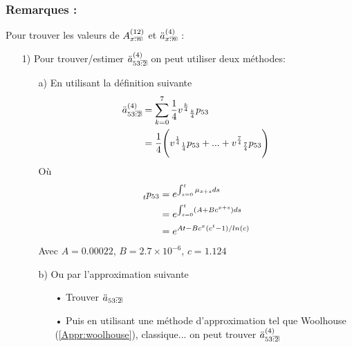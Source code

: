 \documentclass[11pt,french]{report}
\makeatletter
\DeclareRobustCommand{\annuity}[1]{%
\def\arraystretch{0}%
\setlength\arraycolsep{.7pt}%
\setlength\arrayrulewidth{.3pt}%
\begin{array}[b]{@{}c|}\hline
\\[\arraycolsep]%
\scriptstyle #1%
\end{array}%
}
\newcommand{\indiceGauche}[2]{{\vphantom{#2}}_{#1}#2}
\makeatother
\begin{document}
\subsubsection*{Remarques :}
Pour trouver les valeurs de $A_{x \annuity{:n}}^{(12)}$ et $\ddot{a}_{x \annuity{:n}}^{(4)}$ :
\begin{itemize}
\item[1)] Pour trouver/estimer $\ddot{a}_{53 \annuity{:2}}^{(4)}$ on peut utiliser deux méthodes:
\begin{itemize}
\item[a)] En utilisant la définition suivante 
\begin{align*}
 \ddot{a}_{53 \annuity{:2}}^{(4)} &= \sum_{k = 0}^{7} \frac{1}{4} v^{\frac{k}{4}} \indiceGauche{\frac{k}{4}}{p}_{53} \\
 &= \frac{1}{4}\Bigg(  v^{\frac{1}{4}} \indiceGauche{\frac{1}{4}}{p}_{53} + ... + v^{\frac{7}{4}} \indiceGauche{\frac{7}{4}}{p}_{53}\Bigg)
\end{align*} 
Où 
\begin{align*}
\indiceGauche{t}{p}_{53} &= e^{\int_{s=0}^{t}\mu_{x+s}ds} \\
&= e^{\int_{s=0}^{t}(A+Bc^{x+s})ds} \\
&= e^{At - Bc^{x}(c^t - 1)/ln(c)} \\
\end{align*}
Avec $A = 0.00022$, $B= 2.7 \times 10 ^{-6}$, $c=1.124$
\item[b)] Ou par l'approximation suivante
\begin{itemize}
\item[•] Trouver $\ddot{a}_{53 \annuity{:2}}$
\item[•] Puis en utilisant une méthode d'approximation tel que Woolhouse (\ref{Appr:woolhouse}), classique... on peut trouver $\ddot{a}_{53 \annuity{:2}}^{(4)}$
\end{itemize}


\end{itemize}
\end{itemize}
\end{document}
